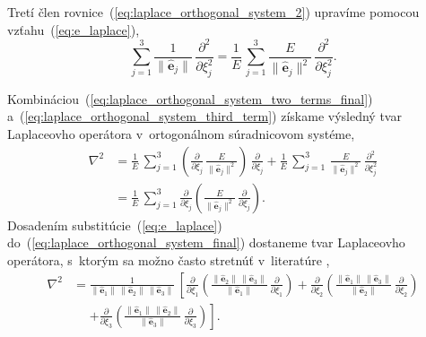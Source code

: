 \documentclass[a4paper,12pt]{book}
\let\vec\mathbf
\begin{document}
Tretí člen rovnice~(\ref{eq:laplace_orthogonal_system_2}) upravíme pomocou 
vzťahu~(\ref{eq:e_laplace}),
%
\begin{equation}
\label{eq:laplace_orthogonal_system_third_term}
\sum_{j = 1}^3 \frac{1}{\| \hat{\vec e}_j \|} \, \frac{\partial^2}{\partial 
\xi_j^2} = \frac{1}{E} \, \sum_{j = 1}^3 \frac{E}{\| \hat{\vec e}_j \|^2} \, 
\frac{\partial^2}{\partial \xi_j^2}{.}
\end{equation}

Kombináciou~(\ref{eq:laplace_orthogonal_system_two_terms_final}) 
a~(\ref{eq:laplace_orthogonal_system_third_term}) získame výsledný tvar 
Laplaceovho operátora v~ortogonálnom súradnicovom systéme,
%
\begin{equation}
\label{eq:laplace_orthogonal_system_final}
\begin{split}
\nabla^2 &= \frac{1}{E} \, \sum_{j = 1}^3 \left( \frac{\partial}{\partial 
\xi_j} \, \frac{E}{\| \hat{\vec e}_j \|^2}\right) \, \frac{\partial}{\partial 
\xi_j} + \frac{1}{E} \, \sum_{j = 1}^3 \, \frac{E}{\| \hat{\vec e}_j \|^2} \, 
\frac{\partial^2}{\partial \xi_j^2}\\
%
&= \frac{1}{E} \, \sum_{j = 1}^3 \frac{\partial}{\partial \xi_j} \left( 
\frac{E}{\| \hat{\vec e}_j  \|^2} \, \frac{\partial}{\partial \xi_j} \right){.}
\end{split}
\end{equation}
%
Dosadením substitúcie~(\ref{eq:e_laplace}) 
do~(\ref{eq:laplace_orthogonal_system_final}) dostaneme tvar Laplaceovho 
operátora, s~ktorým sa možno často stretnúť v~literatúre 
\parencite[napríklad][]{MoritzPhysicalGeodesy},
%
\begin{equation}
\label{eq:laplace_orthogonal_system_final_2}
\begin{split}
\nabla^2 &= \frac{1}{\| \hat{\vec e}_1 \| \, \| \hat{\vec e}_2 \| \, \| 
\hat{\vec e}_3 \|} \, \left[ \frac{\partial}{\partial \xi_1} \left( \frac{\| 
\hat{\vec e}_2 \| \, \| \hat{\vec e}_3 \|}{\| \hat{\vec e}_1 \|} \, 
\frac{\partial}{\partial \xi_1} \right) + \frac{\partial}{\partial \xi_2} 
\left( \frac{\| \hat{\vec e}_1 \| \, \| \hat{\vec e}_3 \|}{\| \hat{\vec e}_2 
\|} \, \frac{\partial}{\partial \xi_2} \right) \right.\\
%
&\phantom{={}}\left. + \frac{\partial}{\partial \xi_3} \left( \frac{\| 
\hat{\vec e}_1 \| \, \| \hat{\vec e}_2 \|}{\| \hat{\vec e}_3 \|} \, 
\frac{\partial}{\partial \xi_3} \right)\right]{.}
\end{split}
\end{equation}
\end{document}
